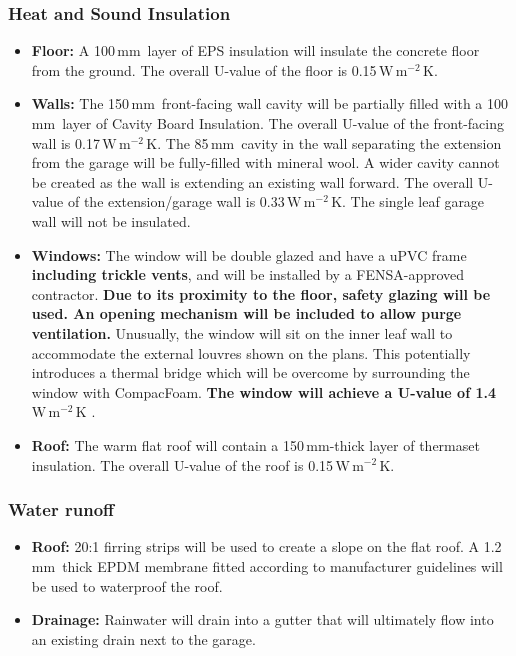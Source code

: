 \documentclass{extension}
\newcommand{\mm}{\,$\mathrm{mm}$}
\newcommand{\uunit}{\,$\mathrm{W\,m^{-2}\,K}$}
\begin{document}
\begin{itemize}
\end{itemize}

\subsubsection{Heat and Sound Insulation}
\begin{itemize}
  \item {\bf Floor:} A 100\mm\ layer of EPS\cite{efins} insulation will insulate the concrete floor from the ground. The overall U-value of the floor is 0.15\uunit .
  \item {\bf Walls:} The 150\mm\ front-facing wall cavity will be partially filled with a 100\mm\ layer of Cavity Board Insulation.\cite{ew1ins} The overall U-value of the front-facing wall is 0.17\uunit . The 85\mm\ cavity in the wall separating the extension from the garage will be fully-filled with mineral wool.\cite{ew2ins} A wider cavity cannot be created as the wall is extending an existing wall forward. The overall U-value of the extension/garage wall is 0.33\uunit. The single leaf garage wall will not be insulated.
  \item {\bf Windows:} The window will be double glazed and have a uPVC frame {\bf including trickle vents}, and will be installed by a FENSA-approved contractor. {\bf Due to its proximity to the floor, safety glazing will be used. An opening mechanism will be included to allow purge ventilation.} Unusually, the window will sit on the inner leaf wall to accommodate the external louvres shown on the plans. This potentially introduces a thermal bridge which will be overcome by surrounding the window with CompacFoam. {\bf The window will achieve a U-value of 1.4\uunit} .\cite{cfoam}
  \item {\bf Roof:} The warm flat roof will contain a 150\mm -thick layer of thermaset insulation.\cite{erins} The overall U-value of the roof is 0.15\uunit .
\end{itemize}
\subsubsection{Water runoff}
\begin{itemize}
  \item {\bf Roof:} 20:1 firring strips will be used to create a slope on the flat roof. A 1.2\mm\ thick EPDM membrane\cite{prmem} fitted according to manufacturer guidelines will be used to waterproof the roof.
  \item {\bf Drainage:} Rainwater will drain into a gutter that will ultimately flow into an existing drain next to the garage.
\end{itemize}
\end{document}
